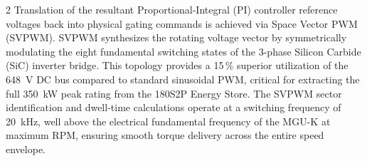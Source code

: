\begin{multicols}{2}
Translation of the resultant Proportional-Integral (PI) controller reference voltages back into physical gating commands is achieved via Space Vector PWM (SVPWM). SVPWM synthesizes the rotating voltage vector by symmetrically modulating the eight fundamental switching states of the 3-phase Silicon Carbide (SiC) inverter bridge. This topology provides a 15\,\% superior utilization of the \SI{648}{V} DC bus compared to standard sinusoidal PWM, critical for extracting the full \SI{350}{kW} peak rating from the 180S2P Energy Store. The SVPWM sector identification and dwell-time calculations operate at a switching frequency of \SI{20}{kHz}, well above the electrical fundamental frequency of the MGU-K at maximum RPM, ensuring smooth torque delivery across the entire speed envelope.
\end{multicols}
